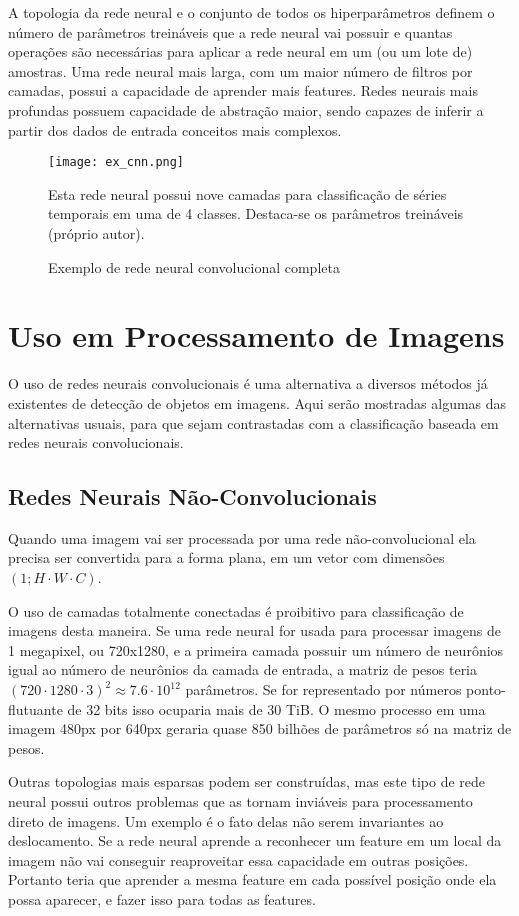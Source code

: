 A topologia da rede neural e o conjunto de todos os hiperparâmetros definem o
número de parâmetros treináveis que a rede neural vai possuir e quantas
operações são necessárias para aplicar a rede neural em um (ou um lote de)
amostras. Uma rede neural mais larga, com um maior número de filtros por
camadas, possui a capacidade de aprender mais features. Redes neurais mais
profundas possuem capacidade de abstração maior, sendo capazes de inferir a
partir dos dados de entrada conceitos mais complexos.

\begin{figure}[!htb]
	\centering
	\texttt{[image: ex\_cnn.png]}
	\caption{Exemplo de rede neural convolucional completa}
	\label{fig:ex_cnn}
	Esta rede neural possui nove camadas para
	classificação de séries temporais em uma de 4 classes. Destaca-se os
	parâmetros treináveis (próprio autor).
\end{figure}

\section{Uso em Processamento de Imagens}
O uso de redes neurais convolucionais é uma alternativa a diversos métodos já
existentes de detecção de objetos em imagens. Aqui serão mostradas algumas das
alternativas usuais, para que sejam contrastadas com a classificação baseada em
redes neurais convolucionais.

\subsection{Redes Neurais Não-Convolucionais}
Quando uma imagem vai ser processada por uma rede não-convolucional ela precisa
ser convertida para a forma plana, em um vetor com dimensões
$(1; H \cdot W \cdot C)$.

O uso de camadas totalmente conectadas é proibitivo para classificação de
imagens desta maneira. Se uma rede neural for usada para processar imagens de 1
megapixel, ou 720x1280, e a primeira camada possuir um número de neurônios igual
ao número de neurônios da camada de entrada, a matriz de pesos teria
$(720 \cdot 1280 \cdot 3)^2 \approx 7.6 \cdot 10^{12}$ parâmetros. Se for
representado por números ponto-flutuante de 32 bits isso ocuparia mais de
30 TiB. O mesmo processo em uma imagem 480px por 640px geraria quase 850
bilhões de parâmetros só na matriz de pesos.

Outras topologias mais esparsas podem ser construídas, mas este tipo de rede
neural possui outros problemas que as tornam inviáveis para processamento direto
de imagens. Um exemplo é o fato delas não serem invariantes ao deslocamento. Se
a rede neural aprende a reconhecer um feature em um local da imagem não vai
conseguir reaproveitar essa capacidade em outras posições. Portanto teria que
aprender a mesma feature em cada possível posição onde ela possa aparecer, e
fazer isso para todas as features.

